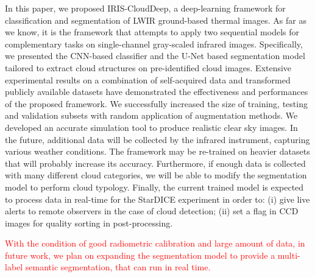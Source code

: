 \documentclass[amt, article]{copernicus}
\begin{document}
In this paper, we proposed IRIS-CloudDeep, a deep-learning framework for classification and segmentation of LWIR
ground-based thermal images. As far as we know, it is the framework that attempts to apply two sequential models for complementary tasks on single-channel gray-scaled infrared images. Specifically, we presented the CNN-based classifier and the U-Net based segmentation model tailored to extract cloud structures on pre-identified cloud images. Extensive experimental results on a combination of self-acquired data and transformed publicly available datasets have demonstrated
the effectiveness and performances of the proposed framework. We successfully increased the size of training, testing and validation subsets with random application of augmentation methods. We developed an accurate simulation tool to produce realistic clear sky images. In the future, additional data will be collected by the infrared instrument, capturing various weather conditions. The framework may be re-trained on heavier datasets that will probably increase its accuracy.  Furthermore, if enough data is collected with many different cloud categories, we will be able to modify the segmentation model to perform cloud typology. Finally, the current trained model is expected to process data in real-time for the StarDICE experiment in order to: (i) give live alerts to remote observers in the case of cloud detection; (ii) set a flag in CCD images for quality sorting in post-processing.

\textcolor{red}{With the condition of good radiometric calibration and large amount of data, in future work, we plan on expanding the segmentation model to provide a multi-label semantic segmentation, that can run in real time.}









\end{document}
